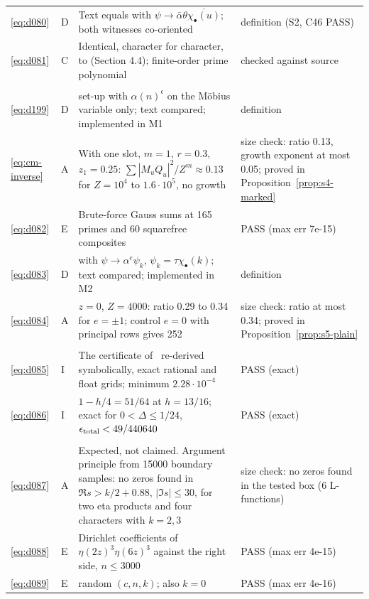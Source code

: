 \documentclass[11pt]{article}
\numberwithin{equation}{section}
\begin{document}
\begin{longtable}{@{}>{\raggedright\arraybackslash}p{1.2cm}>{\centering\arraybackslash}p{0.7cm}>{\raggedright\arraybackslash}p{9.05cm}>{\raggedright\arraybackslash}p{4.3cm}@{}}
\eqref{eq:d080} & D & Text equals \cite[eq.~(8)]{G78} with $\psi\to\bar\alpha\theta\overline{\chi_\bullet(u)}$; both witnesses co-oriented & definition (S2, C46 PASS)\\
\eqref{eq:d081} & C & Identical, character for character, to \cite[eq.~(11)]{G78} (Section 4.4); finite-order prime polynomial & checked against source\\
\multicolumn{4}{@{}l}{\emph{Section~14}}\\
\eqref{eq:d199} & D & \cite[Lemma~17.1]{OAI78} set-up with $\alpha(n)^\epsilon$ on the M\"obius variable only; text compared; implemented in M1 & definition\\
\eqref{eq:cm-inverse} & A & With one slot, $m=1$, $r=0.3$, $z_1=0.25$: $\sum|M_uQ_u|^2/Z^m\approx0.13$ for $Z=10^4$ to $1.6\cdot10^5$, no growth & size check: ratio 0.13, growth exponent at most 0.05; proved in Proposition~\ref{prop:s4-marked}\\
\eqref{eq:d082} & E & Brute-force Gauss sums at 165 primes and 60 squarefree composites & PASS (max err 7e-15)\\
\eqref{eq:d083} & D & \cite[eq.~(4.1)]{OAI78} with $\psi\to\alpha^e\psi_k$, $\psi_k=\tau\chi_\bullet(k)$; text compared; implemented in M2 & definition\\
\eqref{eq:d084} & A & $z=0$, $Z=4000$: ratio 0.29 to 0.34 for $e=\pm1$; control $e=0$ with principal rows gives 252 & size check: ratio at most 0.34; proved in Proposition~\ref{prop:s5-plain}\\
\multicolumn{4}{@{}l}{\emph{Section~15}}\\
\eqref{eq:d085} & I & The certificate of~\cite{OAI78} re-derived symbolically, exact rational and float grids; minimum $2.28\cdot10^{-4}$ & PASS (exact)\\
\eqref{eq:d086} & I & $1-h/4=51/64$ at $h=13/16$; exact for $0<\Delta\le1/24$, $\epsilon_{\rm total}<49/440640$ & PASS (exact)\\
\multicolumn{4}{@{}l}{\emph{Section~17}}\\
\eqref{eq:d087} & A & Expected, not claimed. Argument principle from 15000 boundary samples: no zeros found in $\Re s>k/2+0.88$, $|\Im s|\le30$, for two eta products and four characters with $k=2,3$ & size check: no zeros found in the tested box (6 L-functions)\\
\eqref{eq:d088} & E & Dirichlet coefficients of $\eta(2z)^3\eta(6z)^3$ against the right side, $n\le3000$ & PASS (max err 4e-15)\\
\eqref{eq:d089} & E & 60 random $(c,n,k)$; also $k=0$ & PASS (max err 4e-16)\\

\end{longtable}
\end{document}
